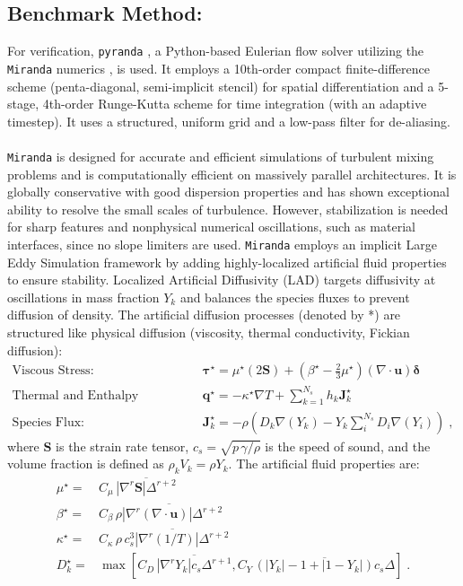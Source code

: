 \documentclass{homework}
\begin{document}
\subsection*{Benchmark Method: \qquad}
For verification, \texttt{pyranda} \cite{pyrandaCode}, a Python-based Eulerian flow solver utilizing the \texttt{Miranda} numerics \cite{Cook2007,Olson2013,Lele1992}, is used. It employs a 10th-order compact finite-difference scheme (penta-diagonal, semi-implicit stencil) for spatial differentiation and a 5-stage, 4th-order Runge-Kutta scheme for time integration (with an adaptive timestep). It uses a structured, uniform grid and a low-pass filter for de-aliasing.
\\ \\
\texttt{Miranda} is designed for accurate and efficient simulations of turbulent mixing problems and is computationally efficient on massively parallel architectures. It is globally conservative with good dispersion properties and has shown exceptional ability to resolve the small scales of turbulence. However, stabilization is needed for sharp features and nonphysical numerical oscillations, such as material interfaces, since no slope limiters are used. \texttt{Miranda} employs an implicit Large Eddy Simulation framework by adding highly-localized artificial fluid properties to ensure stability. Localized Artificial Diffusivity (LAD) targets diffusivity at oscillations in mass fraction $Y_k$ and balances the species fluxes to prevent diffusion of density. The artificial diffusion processes (denoted by *) are structured like physical diffusion (viscosity, thermal conductivity, Fickian diffusion):
\begin{align*}
    \textrm{Viscous Stress:} \quad& \bm{\tau}^\star = \mu^\star \left(2 \bm{S} \right) + \left(\beta^\star - \tfrac{2}{3} \mu^\star \right) \left( \nabla \cdot \mathbf{u} \right) \bm{\delta} \\
    \textrm{Thermal and Enthalpy Diffusion:} \quad& \bm{q}^\star = -\kappa^\star \nabla T + \sum\nolimits_{k=1}^{N_s}{h_k\bm{J}_k^\star} \\
    \textrm{Species Flux:} \quad& \bm{J}_k^\star = -\rho \left(D_k \nabla \left( Y_k \right) - Y_k \sum\nolimits_{i}^{N_s}{D_i \nabla \left( Y_i \right)} \right) \; ,
\end{align*}
where $\bm{S}$ is the strain rate tensor, $c_s = \sqrt{p \, \gamma /\rho}$ is the speed of sound, and the volume fraction is defined as $\rho_k V_k= \rho Y_k$. The artificial fluid properties are:
\begin{align*}
    \mu^\star =& C_\mu \, \overline{\left| \nabla^r \bm{S} \right| \Delta^{r+2}} \\
    \beta^\star =& C_\beta \, \overline{\rho \left| \nabla^r (\nabla \cdot \mathbf{u}) \right| \Delta^{r+2}} \\
    \kappa^\star =& C_\kappa \, \overline{\rho \, c_s^3 \left| \nabla^r (1/T) \right| \Delta^{r+2}} \\
    D_k^\star =& \max \left[ C_D \, \overline{\left| \nabla^r Y_k \right| c_s \Delta^{r+1}}, C_Y \, \overline{\left( \left| Y_k \right| - 1 + \left|1 - Y_k \right| \right) c_s \Delta}\right] \; .
\end{align*}
\end{document}
